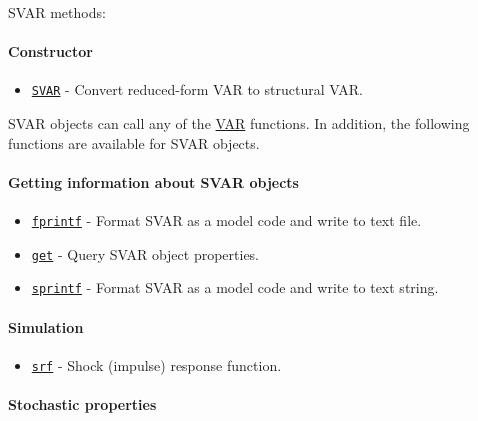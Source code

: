 

	SVAR methods:

\paragraph{Constructor}\label{constructor}

\begin{itemize}
\itemsep1pt\parskip0pt
\item
  \href{SVAR/SVAR}{\texttt{SVAR}} - Convert reduced-form VAR to
  structural VAR.
\end{itemize}

SVAR objects can call any of the \href{VAR/Contents}{VAR} functions. In
addition, the following functions are available for SVAR objects.

\paragraph{Getting information about SVAR
objects}\label{getting-information-about-svar-objects}

\begin{itemize}
\itemsep1pt\parskip0pt
\item
  \href{SVAR/fprintf}{\texttt{fprintf}} - Format SVAR as a model code
  and write to text file.
\item
  \href{SVAR/get}{\texttt{get}} - Query SVAR object properties.
\item
  \href{SVAR/sprintf}{\texttt{sprintf}} - Format SVAR as a model code
  and write to text string.
\end{itemize}

\paragraph{Simulation}\label{simulation}

\begin{itemize}
\itemsep1pt\parskip0pt
\item
  \href{SVAR/srf}{\texttt{srf}} - Shock (impulse) response function.
\end{itemize}

\paragraph{Stochastic properties}\label{stochastic-properties}

